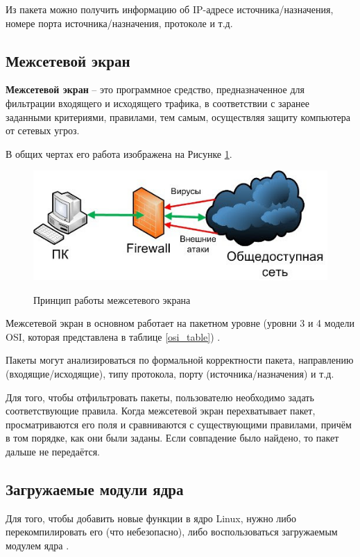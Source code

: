 \newpage

Из пакета можно получить информацию об IP-адресе источника/назначения, номере порта источника/назначения, протоколе и т.д. \newline

\subsection{Межсетевой экран}
\textbf{Межсетевой экран} -- это программное средство, предназначенное для фильтрации входящего и исходящего трафика, в соответствии с заранее заданными критериями, правилами, тем самым, осуществляя защиту компьютера от сетевых угроз. 

В общих чертах его работа изображена на Рисунке \ref{fig1:image}.

\begin{figure}[h]
	\centering
	\begin{center}
		{\includegraphics[scale=0.5]{img/firewall.jpg}}
		\caption{Принцип работы межсетевого экрана}
		\label{fig1:image}
	\end{center}
\end{figure}

\newpage

Межсетевой экран в основном работает на пакетном уровне (уровни 3 и 4 модели OSI, которая представлена в таблице \ref{osi_table}) \cite{fw}. 

Пакеты могут анализироваться по формальной корректности пакета, направлению (входящие/исходящие), типу протокола, порту (источника/назначения) и т.д. 

Для того, чтобы отфильтровать пакеты, пользователю необходимо задать соответствующие правила. Когда межсетевой экран перехватывает пакет, просматриваются его поля и сравниваются с существующими правилами, причём в том порядке, как они были заданы. Если совпадение было найдено, то пакет дальше не передаётся. \newline

\subsection{Загружаемые модули ядра}
Для того, чтобы добавить новые функции в ядро Linux, нужно либо перекомпилировать его (что небезопасно), либо воспользоваться загружаемым модулем ядра \cite{os}. 

